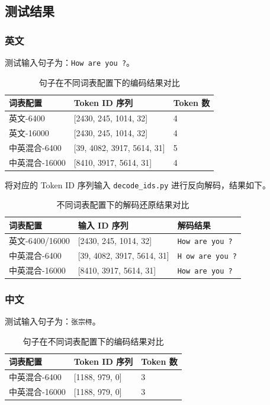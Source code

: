 \documentclass[a4paper,12pt]{ctexart} %
\begin{document}
\subsection{测试结果}
\subsubsection{英文}
测试输入句子为：\texttt{How are you ?}。

\begin{table}[H]
    \centering
    \begin{tabular}{p{} p{} p{}}
        \toprule
        词表配置 & Token ID 序列 & Token 数 \\
        \midrule
        英文-6400 & [2430, 245, 1014, 32] & 4 \\
        英文-16000 & [2430, 245, 1014, 32] & 4 \\
        中英混合-6400 & [39, 4082, 3917, 5614, 31] & 5 \\
        中英混合-16000 & [8410, 3917, 5614, 31] & 4 \\
        \bottomrule
    \end{tabular}
    \caption{句子在不同词表配置下的编码结果对比}
\end{table}

将对应的 Token ID 序列输入 \texttt{decode\_ids.py} 进行反向解码，结果如下。

\begin{table}[H]
    \centering
    \begin{tabular}{p{} p{} p{}}
        \toprule
        词表配置 & 输入 ID 序列 & 解码结果 \\
        \midrule
        英文-6400/16000 & [2430, 245, 1014, 32] & \texttt{How are you ?} \\
        中英混合-6400 & [39, 4082, 3917, 5614, 31] & \texttt{H ow are you ?} \\
        中英混合-16000 & [8410, 3917, 5614, 31] & \texttt{How are you ?} \\
        \bottomrule
    \end{tabular}
    \caption{不同词表配置下的解码还原结果对比}
\end{table}

\subsubsection{中文}
测试输入句子为：\texttt{张宗桪}。

\begin{table}[H]
    \centering
    \begin{tabular}{p{} p{} p{}}
        \toprule
        词表配置 & Token ID 序列 & Token 数 \\
        \midrule

        中英混合-6400 & [1188, 979, 0] & 3 \\
        中英混合-16000 & [1188, 979, 0] & 3 \\
        \bottomrule
    \end{tabular}
    \caption{句子在不同词表配置下的编码结果对比}
\end{table}
\end{document}
